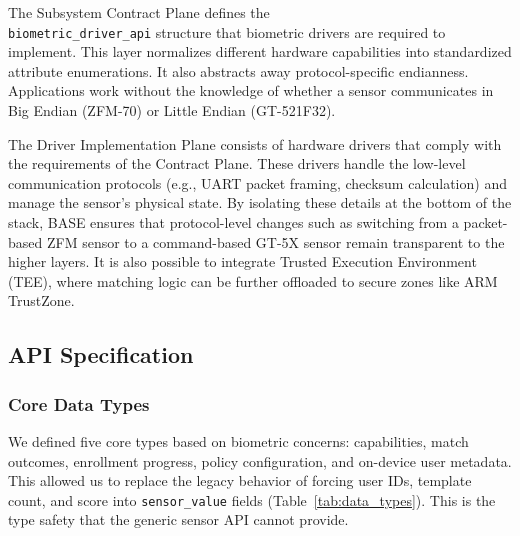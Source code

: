 The Subsystem Contract Plane defines the \\ \texttt{biometric\_driver\_api} structure that biometric drivers are required to implement. This layer normalizes different hardware capabilities into standardized attribute enumerations. It also abstracts away protocol-specific endianness. Applications work without the knowledge of whether a sensor communicates in Big Endian (ZFM-70) or Little Endian (GT-521F32).

The Driver Implementation Plane consists of hardware drivers that comply with the requirements of the Contract Plane. These drivers handle the low-level communication protocols (e.g., UART packet framing, checksum calculation) and manage the sensor's physical state. By isolating these details at the bottom of the stack, BASE ensures that protocol-level changes such as switching from a packet-based ZFM sensor to a command-based GT-5X sensor remain transparent to the higher layers. It is also possible to integrate Trusted Execution Environment (TEE), where matching logic can be further offloaded to secure zones like ARM TrustZone.

\subsection{API Specification}

\subsubsection{Core Data Types}

We defined five core types based on biometric concerns: capabilities, match outcomes, enrollment progress, policy configuration, and on-device user metadata. This allowed us to replace the legacy behavior of forcing user IDs, template count, and score into \texttt{sensor\_value} fields (Table~\ref{tab:data_types}). This is the type safety that the generic sensor API cannot provide.

